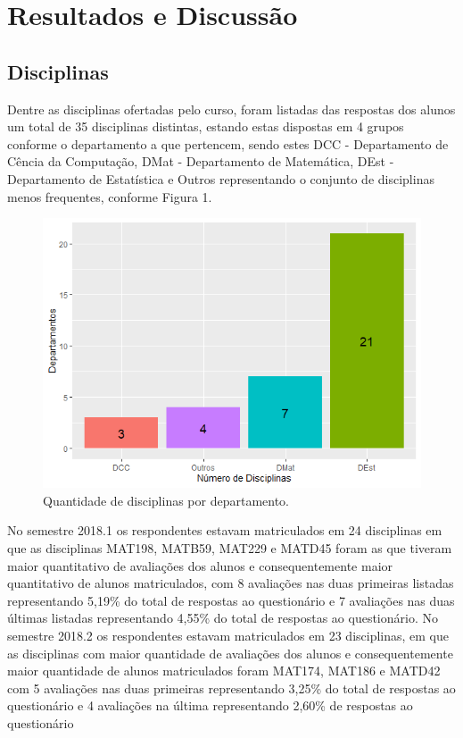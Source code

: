 \documentclass[12pt,a4paper]{article}
\begin{document}

\section{Resultados e Discussão}
\subsection{Disciplinas}
Dentre as disciplinas ofertadas pelo curso, foram listadas das respostas dos alunos um total de 35 disciplinas distintas, estando estas dispostas em 4 grupos conforme o departamento a que pertencem, sendo estes DCC - Departamento de Cência da Computação, DMat - Departamento de Matemática, DEst - Departamento de Estatística e Outros representando o conjunto de disciplinas menos frequentes, conforme Figura 1.

\begin{figure}[!h]
\centering
\includegraphics[scale=0.7]{Imagens/G1.png}
\caption{Quantidade de disciplinas por departamento.}
\end{figure}

No semestre 2018.1 os respondentes estavam matriculados em 24 disciplinas em que as disciplinas MAT198, MATB59, MAT229 e MATD45 foram as que tiveram maior quantitativo de avaliações dos alunos e consequentemente maior quantitativo de alunos matriculados, com 8 avaliações nas duas primeiras listadas representando 5,19\% do total de respostas ao questionário e 7 avaliações nas duas últimas listadas representando 4,55\% do total de respostas ao questionário. No semestre 2018.2 os respondentes estavam matriculados em 23 disciplinas, em que as disciplinas com maior quantidade de avaliações dos alunos e
consequentemente maior quantidade de alunos matriculados foram MAT174, MAT186 e MATD42 com 5 avaliações nas duas primeiras representando 3,25\% do total de respostas ao questionário e 4 avaliações na última representando 2,60\% de respostas ao questionário
\end{document}
